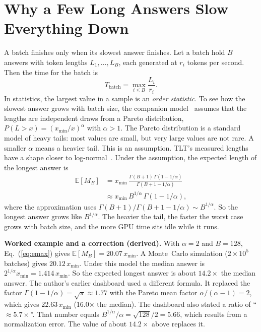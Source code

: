 \documentclass[conference]{IEEEtran}
\newcommand{\x}{\ensuremath{\times}}
\begin{document}
\section{Why a Few Long Answers Slow Everything Down}
\label{sec:tail}

A batch finishes only when its slowest answer finishes. Let a batch hold $B$ answers with token lengths $L_1,\dots,L_B$, each generated at $r_i$ tokens per second. Then the time for the batch is
\begin{equation}
T_{\text{batch}} = \max_{i\le B} \frac{L_i}{r_i}.
\label{eq:tbatch}
\end{equation}
In statistics, the largest value in a sample is an \emph{order statistic}. To see how the slowest answer grows with batch size, the companion model~\cite{hibbs2026dashboard} assumes that the lengths are independent draws from a Pareto distribution, $P(L>x)=(x_{\min}/x)^{\alpha}$ with $\alpha>1$. The Pareto distribution is a standard model of heavy tails: most values are small, but very large values are not rare. A smaller $\alpha$ means a heavier tail. This is an assumption. TLT's measured lengths have a shape closer to log-normal~\cite[Fig.~1a]{hu2026tlt}. Under the assumption, the expected length of the longest answer is
\begin{equation}
\begin{split}
\mathbb{E}[M_B] &= x_{\min}\,\frac{\Gamma(B+1)\,\Gamma(1-1/\alpha)}{\Gamma(B+1-1/\alpha)}\\
&\approx x_{\min}\,B^{1/\alpha}\,\Gamma(1-1/\alpha),
\end{split}
\label{eq:emax}
\end{equation}
where the approximation uses $\Gamma(B+1)/\Gamma(B+1-1/\alpha)\sim B^{1/\alpha}$. So the longest answer grows like $B^{1/\alpha}$. The heavier the tail, the faster the worst case grows with batch size, and the more GPU time sits idle while it runs.

\textbf{Worked example and a correction (derived).} With $\alpha=2$ and $B=128$, Eq.~(\ref{eq:emax}) gives $\mathbb{E}[M_B]=20.07\,x_{\min}$. A Monte~Carlo simulation ($2\times10^5$ batches) gives $20.12\,x_{\min}$. Under this model the median answer is $2^{1/\alpha}x_{\min}=1.414\,x_{\min}$. So the expected longest answer is about $14.2\times$ the median answer. The author's earlier dashboard used a different formula. It replaced the factor $\Gamma(1-1/\alpha)=\sqrt{\pi}\approx1.77$ with the Pareto mean factor $\alpha/(\alpha-1)=2$, which gives $22.63\,x_{\min}$ (16.0\x{} the median). The dashboard also stated a ratio of ``$\approx5.7\times$''. That number equals $B^{1/\alpha}/\alpha=\sqrt{128}/2=5.66$, which results from a normalization error. The value of about $14.2\times$ above replaces it.
\end{document}
